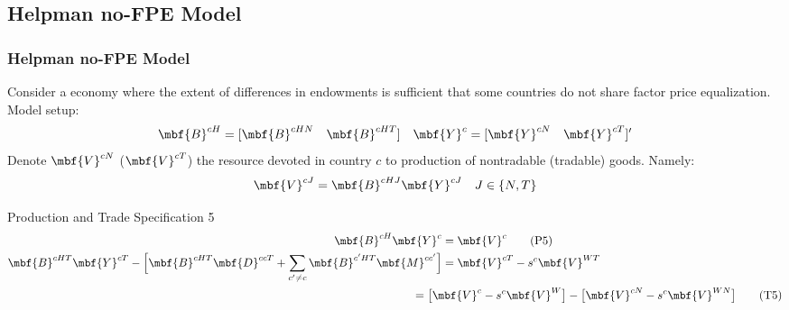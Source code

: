 \documentclass[xcolor=svgnames,10pt]{beamer}
\begin{document}
\subsection{Helpman no-FPE Model}
\begin{frame}[c]\frametitle{Helpman no-FPE Model}
Consider a economy where the extent of differences in endowments is sufficient that some countries do not share factor price equalization. Model setup:
\begin{equation}
\mbf{B}^{cH} = [\mbf{B}^{cHN}\quad \mbf{B}^{cHT}] \quad \mbf{Y}^{c}=[\mbf{Y}^{cN}\quad\mbf{Y}^{cT}]^{\prime}
\end{equation}
Denote $\mbf{V}^{cN}$ ($\mbf{V}^{cT}$) the resource devoted in country $c$ to production of nontradable (tradable) goods. Namely:
\begin{equation}
\mbf{V}^{cJ}=\mbf{B}^{cHJ}\mbf{Y}^{cJ}\quad  J\in \{N,T\}
\end{equation}

\begin{block}{Production and Trade Specification 5}
\begin{align}
\mbf{B}^{cH}\mbf{Y}^{c} &= \mbf{V}^{c}\tag{P5}\\
\mbf{B}^{cHT}\mbf{Y}^{cT}-\Big[\mbf{B}^{cHT}\mbf{D}^{ccT}+\sum_{c^{\prime}\not = c}\mbf{B}^{c^{\prime}HT}\mbf{M}^{cc^{\prime}}\Big]&=\mbf{V}^{cT}-s^{c} \mbf{V}^{WT}\notag\\
&\hspace{-6ex} = \big[\mbf{V}^{c}-s^{c} \mbf{V}^{W}\big]-\big[\mbf{V}^{cN}-s^{c}\mbf{V}^{WN}\big]
\tag{T5}
\end{align}
\end{block}
\end{frame}
\end{document}
